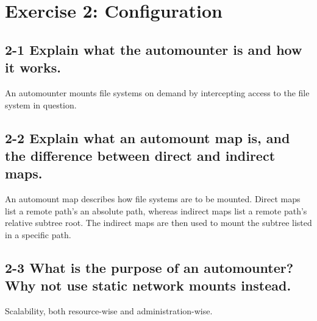 
\section{Exercise 2: Configuration}
\subsection{2-1 Explain what the automounter is and how it works.}
An automounter mounts file systems on demand by intercepting access to the file system in question.

\subsection{2-2 Explain what an automount map is, and the difference between direct and indirect maps.}
An automount map describes how file systems are to be mounted. Direct maps list a remote path's an absolute path, whereas indirect maps list a remote path's relative subtree root. The indirect maps are then used to mount the subtree listed in a specific path.

\subsection{2-3 What is the purpose of an automounter? Why not use static network mounts instead.}
Scalability, both resource-wise and administration-wise.


